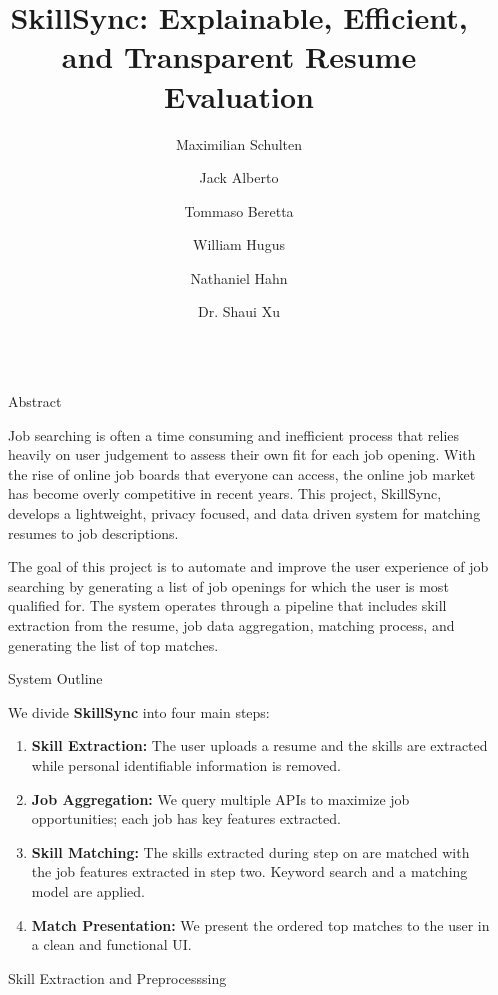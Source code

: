 \documentclass[final]{beamer}
\title{SkillSync: Explainable, Efficient, and Transparent Resume Evaluation}
\author{Maximilian Schulten \inst{1} \and Jack Alberto \inst{1} \and Tommaso Beretta \inst{1} \and William Hugus \inst{1} \and Nathaniel Hahn \inst{1} \and Dr. Shaui Xu\inst{1}}
\institute[shortinst]{\inst{1} Case Western Reserve University School of Engineering, Department of Computer and Data Sciences} %
\newlength{\sepwidth}
\newlength{\colwidth}
\newcommand{\separatorcolumn}{\begin{column}{\sepwidth}\end{column}}
\begin{document}
\begin{frame}[t]
\begin{columns}[t]
\separatorcolumn

\begin{column}{\colwidth}

  \begin{block}{Abstract}

    Job searching is often a time consuming and inefficient process that relies heavily on user judgement to assess their own fit for each job opening. 
    With the rise of online job boards that everyone can access, the online job market has become overly competitive in recent years. 
    This project, SkillSync, develops a lightweight, privacy focused, and data driven system for matching resumes to job descriptions. 

    The goal of this project is to automate and improve the user experience of job searching by generating a list of job openings for which the user is most qualified for. 
    The system operates through a pipeline that includes skill extraction from the resume, job data aggregation, matching process, and generating the list of top matches. 
  \end{block}

  \begin{block}{System Outline}
    
      We divide \textbf{SkillSync} into four main steps:

    \begin{enumerate}
      \item \textbf{Skill Extraction:} The user uploads a resume and the skills are extracted while personal identifiable information is removed.
      \item \textbf{Job Aggregation:} We query multiple APIs to maximize job opportunities; each job has key features extracted.
      \item \textbf{Skill Matching:} The skills extracted during step on are matched with the job features extracted in step two. Keyword search and a matching model are applied. 
      \item \textbf{Match Presentation:} We present the ordered top matches to the user in a clean and functional UI.
    \end{enumerate}

  \end{block}

  \begin{alertblock}{Skill Extraction and Preprocesssing}


\end{alertblock}
\end{column}
\end{columns}
\end{frame}
\end{document}
